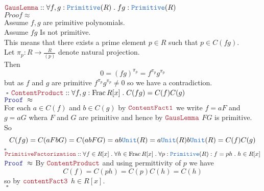 \documentclass[12pt]{article}
\newcommand{\TYPE}[1]{\textcolor{NavyBlue}{\mathtt{#1}}}
\newcommand{\LOGIC}[1]{\textcolor{Blue}{\mathtt{#1}}}
\newcommand{\THM}[1]{\textcolor{Maroon}{\mathtt{#1}}}
\renewcommand{\.}{\; . \;}
\newcommand{\QED}{\; \square}
\newcommand{\Proof}{\LOGIC{Proof} \; }
\begin{document}
\\ \\
$\THM{GausLemma} :: \forall f, g : \TYPE{Primitive}(R) \. fg : \TYPE{Primitive}(R)  $ \\
$Proof \approx $\\
Assume $f,g$ are primitive polynomials.\\
Assume $fg$ Is not primitive.\\
This means that there exists a prime element $p \in R$ such that $p \in C(fg)$. \\
Let $\pi_p : R \to \frac{R}{(p)}$ denote natural projection. \\
Then $$0 = (fg)^{\pi_p} = f^{\pi_p}g^{\pi_p}$$
but as $f$ and $g$ are primitive $f^{\pi_p}g^{\pi_p} \neq 0$ so we have a contradiction.
\\$\QED$
\newpage
$\THM{ContentProduct} :: \forall   f,g : \mathrm{Frac} \, R [x] \. C(fg) = C(f)C(g)  $ 
\\$\Proof \approx $ \\
For each $a \in C(f)$ and $b \in C(g)$ by $\THM{ContentFact1}$ we write $f = aF$ and $g = aG$ whera $F$ and $G$ are primitive and hence by $\THM{GausLemma} $ $FG$ is primitive. \\
So
$$ C(fg) = C(aFbG) = C(abFG) = ab\TYPE{Unit}(R) = a\TYPE{Unit}(R)b\TYPE{Unit}(R) = C(f)C(g) $$
 $\square$
 \\ 
$\THM{PrimitiveFactorization} :: \forall f \in R[x] \. \forall h \in  \mathrm{Frac} \, R[x] \. \forall p : \TYPE{Primitive}(R) : f = ph \. h \in R[x] $\\
$\Proof \approx$
By $\THM{ContentProduct}$ and using permittivity of $p$ we have
$$
C(f) = C(ph) = C(p)C(h) = C(h)
$$
so by $\THM{contentFact3}$ $h \in R[x]$. 
\\ $\QED$ 
\end{document}
